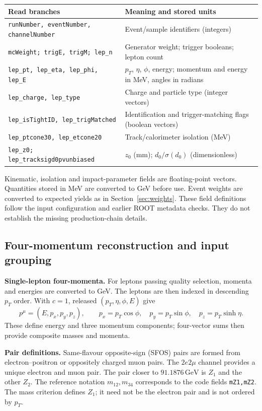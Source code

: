 \documentclass[11pt,a4paper]{article}
\newcommand{\gev}{\,\mathrm{GeV}}
\begin{document}
\begingroup
\small
\renewcommand{\arraystretch}{1.13}
\begin{tabularx}{\linewidth}{@{}p{.53\linewidth}Y@{}}
\toprule
Read branches & Meaning and stored units \\
\midrule
\texttt{runNumber, eventNumber, channelNumber} & Event/sample identifiers (integers) \\
\texttt{mcWeight; trigE, trigM; lep\_n} & Generator weight; trigger booleans; lepton count \\
\texttt{lep\_pt, lep\_eta, lep\_phi, lep\_E} & $p_T$, $\eta$, $\phi$, energy; momentum and energy in MeV, angles in radians \\
\texttt{lep\_charge, lep\_type} & Charge and particle type (integer vectors) \\
\texttt{lep\_isTightID, lep\_trigMatched} & Identification and trigger-matching flags (boolean vectors) \\
\texttt{lep\_ptcone30, lep\_etcone20} & Track/calorimeter isolation (MeV) \\
\texttt{lep\_z0; lep\_tracksigd0pvunbiased} & $z_0$ (mm); $d_0/\sigma(d_0)$ (dimensionless) \\
\bottomrule
\end{tabularx}
\endgroup

Kinematic, isolation and impact-parameter fields are floating-point vectors.
Quantities stored in MeV are converted to GeV before use.
Event weights are converted to expected yields as in Section~\ref{sec:weights}.
These field definitions follow the input configuration and earlier ROOT metadata checks. They do not establish the missing production-chain details.

\subsection{Four-momentum reconstruction and input grouping}
\textbf{Single-lepton four-momenta.}
For leptons passing quality selection, momenta and energies are converted to GeV. The leptons are then indexed in descending $p_T$ order.
With $c=1$, released $(p_T,\eta,\phi,E)$ give
\[
 p^\mu=(E,p_x,p_y,p_z),\qquad
 p_x=p_T\cos\phi,\quad p_y=p_T\sin\phi,\quad p_z=p_T\sinh\eta.
\]
These define energy and three momentum components; four-vector sums then provide composite masses and momenta.

\textbf{Pair definitions.}
Same-flavour opposite-sign (SFOS) pairs are formed from electron--positron or oppositely charged muon pairs.
The $2e2\mu$ channel provides a unique electron and muon pair.
The pair closer to $91.1876\gev$ is $Z_1$ and the other $Z_2$.
The reference notation $m_{12},m_{34}$ corresponds to the code fields \texttt{mZ1,mZ2}. The mass criterion defines $Z_1$; it need not be the electron pair and is not ordered by $p_T$.
\end{document}
